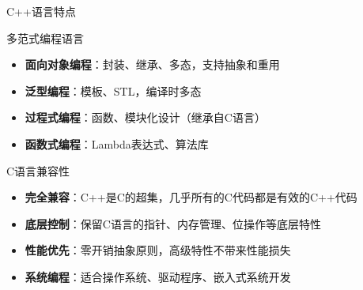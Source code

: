 \documentclass[UTF8,aspectratio=169]{beamer}
\begin{document}
\begin{frame}{C++语言特点}
    \begin{ytublock}{多范式编程语言}
        \begin{itemize}
            \item \textbf{面向对象编程}：封装、继承、多态，支持抽象和重用
            \item \textbf{泛型编程}：模板、STL，编译时多态
            \item \textbf{过程式编程}：函数、模块化设计（继承自C语言）
            \item \textbf{函数式编程}：Lambda表达式、算法库
        \end{itemize}
    \end{ytublock}

    \begin{ytublock}{C语言兼容性}
        \begin{itemize}
            \item \textbf{完全兼容}：C++是C的超集，几乎所有的C代码都是有效的C++代码
            \item \textbf{底层控制}：保留C语言的指针、内存管理、位操作等底层特性
            \item \textbf{性能优先}：零开销抽象原则，高级特性不带来性能损失
            \item \textbf{系统编程}：适合操作系统、驱动程序、嵌入式系统开发
        \end{itemize}
    \end{ytublock}
\end{frame}
\end{document}
